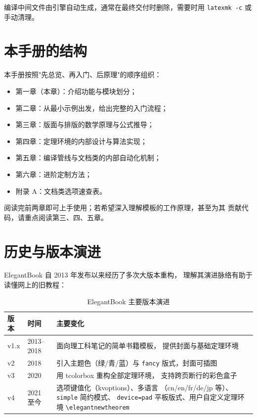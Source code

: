 编译中间文件由引擎自动生成，通常在最终交付时删除，需要时用
\texttt{latexmk -c} 或手动清理。

\section{本手册的结构}

本手册按照"先总览、再入门、后原理"的顺序组织：

\begin{itemize}
  \item 第一章（本章）：介绍功能与模块划分；
  \item 第二章：从最小示例出发，给出完整的入门流程；
  \item 第三章：版面与排版的数学原理与公式推导；
  \item 第四章：定理环境的内部设计与算法实现；
  \item 第五章：编译管线与文档类的内部自动化机制；
  \item 第六章：进阶定制方法；
  \item 附录 A：文档类选项速查表。
\end{itemize}

阅读完前两章即可上手使用；若希望深入理解模板的工作原理，甚至为其
贡献代码，请重点阅读第三、四、五章。

\section{历史与版本演进}

ElegantBook 自 2013 年发布以来经历了多次大版本重构，
理解其演进脉络有助于读懂网上的旧教程：

\begin{table}[htbp]
  \centering
  \caption{ElegantBook 主要版本演进}\label{tab:history}
  \begin{tabular}{llp{7.6cm}}
    \toprule
    版本 & 时间 & 主要变化 \\
    \midrule
    v1.x & 2013--2018 & 面向理工科笔记的简单书籍模板，
          提供封面与基础定理环境 \\
    v2   & 2018      & 引入主题色（绿/青/蓝）与
          \texttt{fancy} 版式，封面可插图 \\
    v3   & 2020      & 用 tcolorbox 重构全部定理环境，
          支持跨页断行的彩色盒子 \\
    v4   & 2021 至今 & 选项键值化（kvoptions）、多语言
          （cn/en/fr/de/jp 等）、\texttt{simple} 简约模式、
          \texttt{device=pad} 平板版式、用户自定义定理环境
          \texttt{\textbackslash elegantnewtheorem} \\
    \bottomrule
  \end{tabular}
\end{table}

